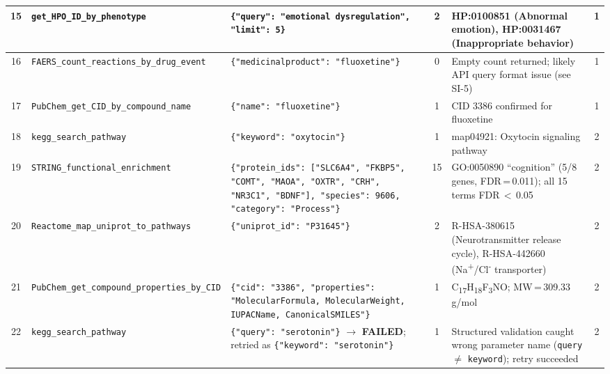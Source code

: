 \begin{longtable}{@{}c p{2.6cm} p{5.2cm} c p{3.8cm} c@{}}
15 &
\texttt{get\_HPO\_ID\_by\_\allowbreak phenotype} &
\texttt{\{"query": "emotional dysregulation", "limit": 5\}} &
2 &
HP:0100851 (Abnormal emotion), HP:0031467 (Inappropriate behavior) &
1 \\
\midrule

16 &
\texttt{FAERS\_count\_\allowbreak reactions\_by\_\allowbreak drug\_event} &
\texttt{\{"medicinalproduct": "fluoxetine"\}} &
0 &
Empty count returned; likely API query format issue (see SI-5) &
1 \\
\midrule

17 &
\texttt{PubChem\_get\_CID\_\allowbreak by\_compound\_\allowbreak name} &
\texttt{\{"name": "fluoxetine"\}} &
1 &
CID 3386 confirmed for fluoxetine &
1 \\
\midrule


18 &
\texttt{kegg\_search\_\allowbreak pathway} &
\texttt{\{"keyword": "oxytocin"\}} &
1 &
map04921: Oxytocin signaling pathway &
2 \\
\midrule

19 &
\texttt{STRING\_functional\_\allowbreak enrichment} &
\texttt{\{"protein\_ids": ["SLC6A4", "FKBP5", "COMT", "MAOA", "OXTR", "CRH", "NR3C1", "BDNF"], "species": 9606, "category": "Process"\}} &
15 &
GO:0050890 ``cognition'' (5/8 genes, FDR\,=\,0.011); all 15 terms FDR\,$<$\,0.05 &
2 \\
\midrule

20 &
\texttt{Reactome\_map\_\allowbreak uniprot\_to\_\allowbreak pathways} &
\texttt{\{"uniprot\_id": "P31645"\}} &
2 &
R-HSA-380615 (Neurotransmitter release cycle), R-HSA-442660 (Na\textsuperscript{+}/Cl\textsuperscript{-} transporter) &
2 \\
\midrule

21 &
\texttt{PubChem\_get\_\allowbreak compound\_\allowbreak properties\_by\_CID} &
\texttt{\{"cid": "3386", "properties": "MolecularFormula, MolecularWeight, IUPACName, CanonicalSMILES"\}} &
1 &
C\textsubscript{17}H\textsubscript{18}F\textsubscript{3}NO; MW\,=\,309.33\,g/mol &
2 \\
\midrule

22 &
\texttt{kegg\_search\_\allowbreak pathway} &
\texttt{\{"query": "serotonin"\}} $\rightarrow$ \textbf{FAILED}; retried as \texttt{\{"keyword": "serotonin"\}} &
1 &
Structured validation caught wrong parameter name (\texttt{query} $\neq$ \texttt{keyword}); retry succeeded &
2 \\
\midrule



\end{longtable}
